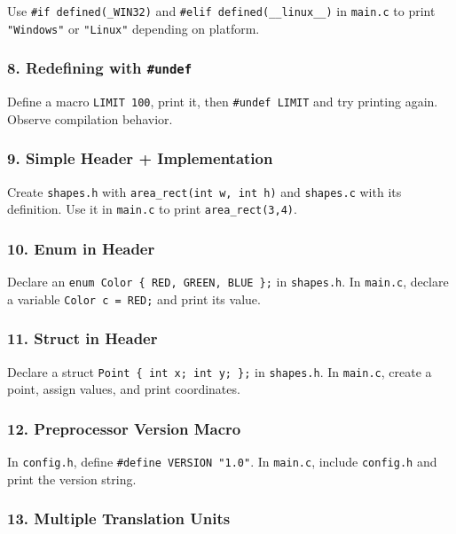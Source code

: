 \documentclass[
  letterpaper,
  DIV=11,
  numbers=noendperiod]{scrreprt}
\begin{document}
Use \texttt{\#if\ defined(\_WIN32)} and
\texttt{\#elif\ defined(\_\_linux\_\_)} in \texttt{main.c} to print
\texttt{"Windows"} or \texttt{"Linux"} depending on platform.

\subsubsection{\texorpdfstring{8. Redefining with
\texttt{\#undef}}{8. Redefining with \#undef}}\label{redefining-with-undef}

Define a macro \texttt{LIMIT\ 100}, print it, then
\texttt{\#undef\ LIMIT} and try printing again. Observe compilation
behavior.

\subsubsection{9. Simple Header +
Implementation}\label{simple-header-implementation}

Create \texttt{shapes.h} with \texttt{area\_rect(int\ w,\ int\ h)} and
\texttt{shapes.c} with its definition. Use it in \texttt{main.c} to
print \texttt{area\_rect(3,4)}.

\subsubsection{10. Enum in Header}\label{enum-in-header}

Declare an \texttt{enum\ Color\ \{\ RED,\ GREEN,\ BLUE\ \};} in
\texttt{shapes.h}. In \texttt{main.c}, declare a variable
\texttt{Color\ c\ =\ RED;} and print its value.

\subsubsection{11. Struct in Header}\label{struct-in-header}

Declare a struct \texttt{Point\ \{\ int\ x;\ int\ y;\ \};} in
\texttt{shapes.h}. In \texttt{main.c}, create a point, assign values,
and print coordinates.

\subsubsection{12. Preprocessor Version
Macro}\label{preprocessor-version-macro}

In \texttt{config.h}, define \texttt{\#define\ VERSION\ "1.0"}. In
\texttt{main.c}, include \texttt{config.h} and print the version string.

\subsubsection{13. Multiple Translation
Units}\label{multiple-translation-units}
\end{document}

